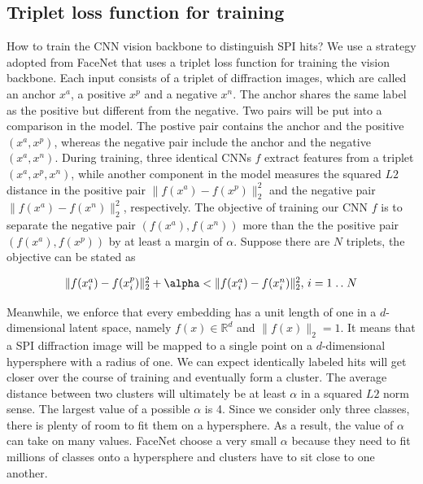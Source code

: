 \subsection{Triplet loss function for training}

How to train the CNN vision backbone to distinguish SPI hits?  We use a strategy
adopted from FaceNet \cite{schroffFaceNetUnifiedEmbedding2015} that uses a
triplet loss function for training the vision backbone.  Each input consists of
a triplet of diffraction images, which are called an anchor $x^a$, a positive
$x^p$ and a negative $x^n$. The anchor shares the same label as the positive but
different from the negative.  Two pairs will be put into a comparison in the
model. The postive pair contains the anchor and the positive $(x^a, x^p)$,
whereas the negative pair include the anchor and the negative $(x^a, x^n)$.
During training, three identical CNNs $f$ extract features from a triplet $(x^a,
x^p, x^n)$, while another component in the model measures the squared $L2$
distance in the positive pair $\|f(x^a) - f(x^p)\|_2^2$ and the negative pair
$\|f(x^a) - f(x^n) \|_2^2$, respectively.  The objective of training our CNN $f$
is to separate the negative pair $(f(x^a), f(x^n))$ more than the the positive
pair $(f(x^a), f(x^p))$ by at least a margin of $\alpha$.  Suppose there are $N$
triplets, the objective can be stated as 

\newcommand{\isep}{\mathrel{{.}\,{.}}\nobreak}
\begin{equation} \label{eq:objective}
    \begin{array}{l}
       \|f(x_i^a) - f(x_i^p)\|_2^2 + \alpha < \|f(x_i^a) - f(x_i^n)\|_2^2, \, i = 1 \isep N
    \end{array}
\end{equation}

Meanwhile, we enforce that every embedding has a unit length of one in a
$d$-dimensional latent space, namely $f(x) \in \mathbb{R}^d$ and $\|f(x)
\|_2=1$. It means that a SPI diffraction image will be mapped to a single point
on a $d$-dimensional hypersphere with a radius of one.  We can expect
identically labeled hits will get closer over the course of training and
eventually form a cluster.  The average distance between two clusters will
ultimately be at least $\alpha$ in a squared $L2$ norm sense. The largest value
of a possible $\alpha$ is 4. Since we consider only three classes, there is
plenty of room to fit them on a hypersphere.  As a result, the value of $\alpha$
can take on many values.  FaceNet choose a very small $\alpha$ because they need
to fit millions of classes onto a hypersphere and clusters have to sit close to
one another.  

